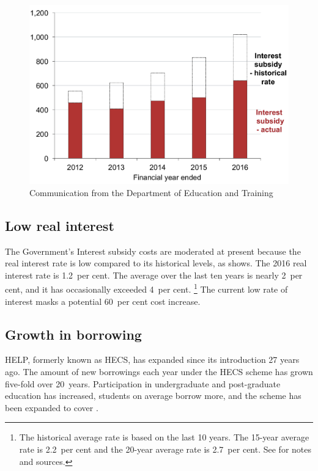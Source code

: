 \documentclass[embargoed]{grattan}
\begin{document}
\begin{figure}
\begin{minipage}[t][\textheight]{\columnwidth}
\includegraphics[page=3]{atlas/Chartpack.pdf}
%
{Communication from the Department of Education and Training}
\end{minipage}
\end{figure}

\subsection{Low real interest}\label{low-real-interest}

The Government's \gls{Interest subsidy} costs are moderated at present because the real interest rate is low compared to its historical levels, as  shows.
The 2016 real interest rate is 1.2~per cent.
The average over the last ten years is nearly 2~per cent, and it has occasionally exceeded 4~per cent.%
\footnote{The historical average rate is based on the last 10 years.
The 15-year average rate is 2.2~per cent and the 20-year average rate is 2.7~per cent. See   for notes and sources.
} The current low rate of interest masks a potential 60~per cent cost increase.

\subsection{Growth in borrowing}\label{subsec:growth-in-borrowing} 

\gls{HELP}, formerly known as \gls{HECS}, has expanded since its introduction 27 years ago.
The amount of new borrowings each year under the \gls{HECS} scheme has grown five-fold over 20~years. Participation in undergraduate and post-graduate education has increased, students on average borrow more, and the scheme has been expanded to cover .
\end{document}
